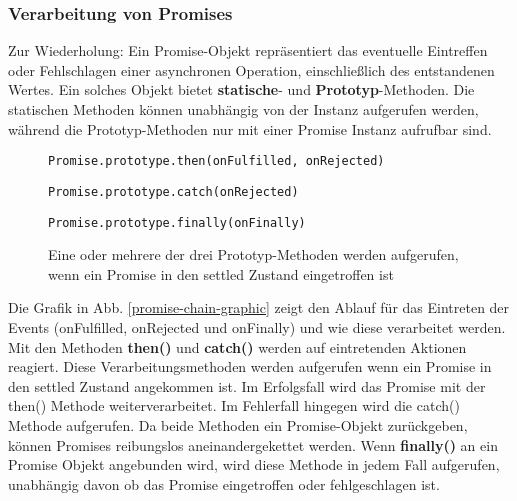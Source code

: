 \subsubsection{Verarbeitung von Promises}

Zur Wiederholung: Ein Promise-Objekt repräsentiert das eventuelle Eintreffen oder Fehlschlagen einer asynchronen Operation, einschließlich des entstandenen Wertes. Ein solches Objekt bietet \textbf{statische}- und \textbf{Prototyp}-Methoden. Die statischen Methoden können unabhängig von der Instanz aufgerufen werden, während die Prototyp-Methoden nur mit einer Promise Instanz aufrufbar sind.

\begin{description}

\begin{figure}[H]
\item \begin{lstlisting}[basicstyle=\small]
Promise.prototype.then(onFulfilled, onRejected)
\end{lstlisting}

\item \begin{lstlisting}[basicstyle=\small]
Promise.prototype.catch(onRejected)
\end{lstlisting}


\item \begin{lstlisting}[basicstyle=\small]
Promise.prototype.finally(onFinally)
\end{lstlisting}
\caption{Eine oder mehrere der drei Prototyp-Methoden werden aufgerufen, wenn ein Promise in den settled Zustand eingetroffen ist}
\end{figure}

\end{description}

\noindent
Die Grafik in Abb. \ref{promise-chain-graphic} zeigt den Ablauf für das Eintreten der Events (onFulfilled, onRejected und onFinally) und wie diese verarbeitet werden. Mit den Methoden \textbf{then()} und \textbf{catch()} werden auf eintretenden Aktionen reagiert. Diese Verarbeitungsmethoden werden aufgerufen wenn ein Promise in den settled Zustand angekommen ist. Im Erfolgsfall wird das Promise mit der then() Methode weiterverarbeitet. Im Fehlerfall hingegen wird die catch() Methode aufgerufen. Da beide Methoden ein Promise-Objekt zurückgeben, können Promises reibungslos aneinandergekettet werden. Wenn \textbf{finally()} an ein Promise Objekt angebunden wird, wird diese Methode in jedem Fall aufgerufen, unabhängig davon ob das Promise eingetroffen oder fehlgeschlagen ist.

